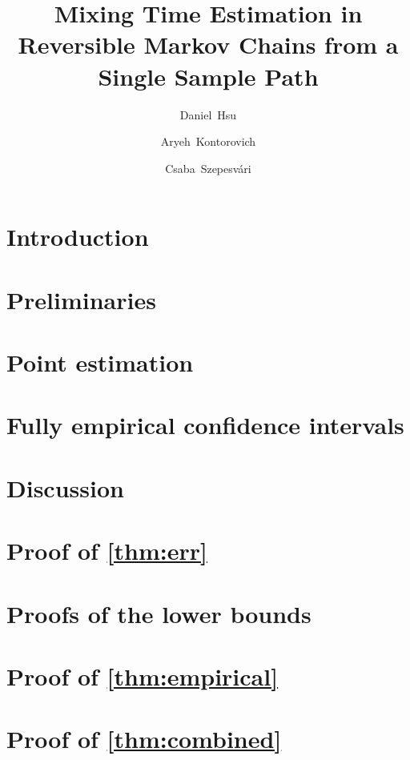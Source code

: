 \documentclass{article}
\title{%
  Mixing Time Estimation in Reversible Markov Chains from a Single
  Sample Path%
}
\author[1]{\mbox{Daniel Hsu}}
\author[2]{\mbox{Aryeh Kontorovich}}
\author[3]{\mbox{Csaba Szepesv\'ari}}
\affil[1]{\mbox{Columbia University}}
\affil[2]{\mbox{Ben-Gurion University}}
\affil[3]{\mbox{University of Alberta}}
\begin{document}
\maketitle

\begin{abstract} 

\end{abstract} 

\section{Introduction}\label{sec:intro}


\section{Preliminaries}\label{sec:prelim}


\section{Point estimation}\label{sec:rates}


\section{Fully empirical confidence intervals}\label{sec:empirical}


\section{Discussion}\label{sec:discussion}





\appendix

\section{Proof of \cref{thm:err}}\label{app:upper}


\section{Proofs of the lower bounds}\label{app:lower}


\section{Proof of \cref{thm:empirical}}\label{app:empirical}


\section{Proof of \cref{thm:combined}}\label{app:combined}

\end{document}
